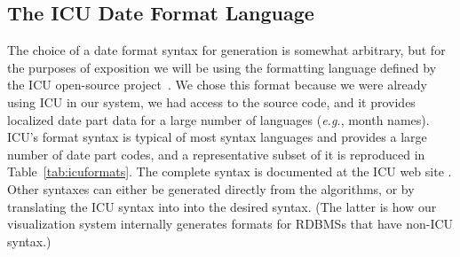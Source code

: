 \subsection{The ICU Date Format Language}

The choice of a date format syntax for generation is somewhat arbitrary, but for the purposes of exposition we will be using the formatting language defined by the ICU open-source project~\cite{ICU}. We chose this format because we were already using ICU in our system, we had access to the source code, and it provides localized date part data for a large number of languages (\textit{e.g.}, month names). ICU's format syntax is typical of most syntax languages and provides a large number of date part codes, and a representative subset of it is reproduced in Table~\ref{tab:icuformats}. The complete syntax is documented at the ICU web site \cite{ICU}.  Other syntaxes can either be generated directly from the algorithms, or by translating the ICU syntax into into the desired syntax. 
(The latter is how our visualization system internally generates formats for RDBMSs that have non-ICU syntax.)
